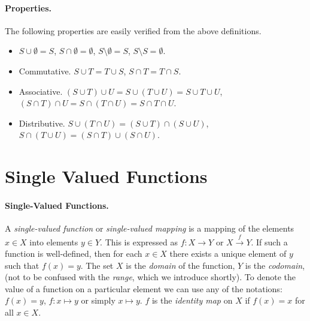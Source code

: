 \paragraph{Properties.}
The following properties are easily verified from the above definitions.
\begin{itemize}
\item 
$S \cup \emptyset = S$, $S \cap \emptyset = \emptyset$,
$S \setminus \emptyset = S$, $S \setminus S = \emptyset$. 
\item
Commutative.
$S \cup T = T \cup S$, $S \cap T = T \cap S$.
\item
Associative.
$(S \cup T) \cup U = S \cup (T \cup U) = S \cup T \cup U$,
$(S \cap T) \cap U = S \cap (T \cap U) = S \cap T \cap U$.
\item
Distributive.
$S \cup (T \cap U) = (S \cup T) \cap (S \cup U)$,
$S \cap (T \cup U) = (S \cap T) \cup (S \cap U)$.
\end{itemize}







\section{Single Valued Functions}


\paragraph{Single-Valued Functions.}
A \textit{single-valued function} or \textit{single-valued mapping}
is a mapping of the elements $x \in X$ 
into elements $y \in Y$.  This is expressed as $f : X \to Y$
or $X \stackrel{f}{\to} Y$.
If such a function is well-defined, then for each $x \in X$ there exists 
a unique element of $y$ such that $f(x) = y$.
The set $X$ is the \textit{domain} of the function, $Y$ is the 
\textit{codomain}, (not to be confused with the \textit{range}, which 
we introduce shortly).
To denote the value of a function on a particular element we can use any 
of the notations: $f(x) = y$, $f : x \mapsto y$ or simply $x \mapsto y$.
$f$ is the \textit{identity map} on $X$ if $f(x) = x$ for all $x \in X$.

